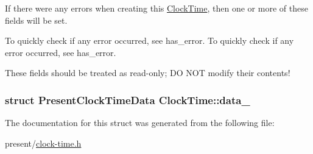 If there were any errors when creating this \hyperlink{structClockTime}{Clock\-Time}, then one or more of these fields will be set. 

To quickly check if any error occurred, see {\ttfamily has\-\_\-error}. To quickly check if any error occurred, see {\ttfamily has\-\_\-error}.

These fields should be treated as read-\/only; D\-O N\-O\-T modify their contents! \hypertarget{structClockTime_a3fe115dffef3ba153e1fff6e0b2c0a23}{
\subsubsection[{data\-\_\-}]{\setlength{\rightskip}{0pt plus 5cm}struct Present\-Clock\-Time\-Data Clock\-Time\-::data\-\_\-}}\label{structClockTime_a3fe115dffef3ba153e1fff6e0b2c0a23}


The documentation for this struct was generated from the following file\-:\begin{DoxyCompactItemize}
\item 
present/\hyperlink{clock-time_8h}{clock-\/time.\-h}\end{DoxyCompactItemize}
